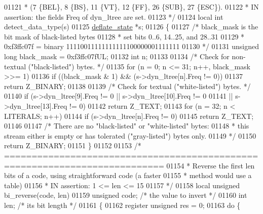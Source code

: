 \begin{DoxyCode}
{{{{{{{{{{{{{{{{{{{{{{{{01121 \textcolor{comment}{ *   (7 \{BEL\}, 8 \{BS\}, 11 \{VT\}, 12 \{FF\}, 26 \{SUB\}, 27 \{ESC\}).}
01122 \textcolor{comment}{ * IN assertion: the fields Freq of dyn\_ltree are set.}
01123 \textcolor{comment}{ */}
01124 local \textcolor{keywordtype}{int} detect\_data\_type(s)
01125     \hyperlink{structinternal__state}{deflate\_state} *s;
01126 \{
01127     \textcolor{comment}{/* black\_mask is the bit mask of black-listed bytes}
01128 \textcolor{comment}{     * set bits 0..6, 14..25, and 28..31}
01129 \textcolor{comment}{     * 0xf3ffc07f = binary 11110011111111111100000001111111}
01130 \textcolor{comment}{     */}
01131     \textcolor{keywordtype}{unsigned} \textcolor{keywordtype}{long} black\_mask = 0xf3ffc07fUL;
01132     \textcolor{keywordtype}{int} n;
01133 
01134     \textcolor{comment}{/* Check for non-textual ("black-listed") bytes. */}
01135     \textcolor{keywordflow}{for} (n = 0; n <= 31; n++, black\_mask >>= 1)
01136         \textcolor{keywordflow}{if} ((black\_mask & 1) && (s->dyn\_ltree[n].Freq != 0))
01137             \textcolor{keywordflow}{return} Z\_BINARY;
01138 
01139     \textcolor{comment}{/* Check for textual ("white-listed") bytes. */}
01140     \textcolor{keywordflow}{if} (s->dyn\_ltree[9].Freq != 0 || s->dyn\_ltree[10].Freq != 0
01141             || s->dyn\_ltree[13].Freq != 0)
01142         \textcolor{keywordflow}{return} Z\_TEXT;
01143     \textcolor{keywordflow}{for} (n = 32; n < LITERALS; n++)
01144         \textcolor{keywordflow}{if} (s->dyn\_ltree[n].Freq != 0)
01145             \textcolor{keywordflow}{return} Z\_TEXT;
01146 
01147     \textcolor{comment}{/* There are no "black-listed" or "white-listed" bytes:}
01148 \textcolor{comment}{     * this stream either is empty or has tolerated ("gray-listed") bytes only.}
01149 \textcolor{comment}{     */}
01150     \textcolor{keywordflow}{return} Z\_BINARY;
01151 \}
01152 
01153 \textcolor{comment}{/* ===========================================================================}
01154 \textcolor{comment}{ * Reverse the first len bits of a code, using straightforward code (a faster}
01155 \textcolor{comment}{ * method would use a table)}
01156 \textcolor{comment}{ * IN assertion: 1 <= len <= 15}
01157 \textcolor{comment}{ */}
01158 local \textcolor{keywordtype}{unsigned} bi\_reverse(code, len)
01159     \textcolor{keywordtype}{unsigned} code; \textcolor{comment}{/* the value to invert */}
01160     \textcolor{keywordtype}{int} len;       \textcolor{comment}{/* its bit length */}
01161 \{
01162     \textcolor{keyword}{register} \textcolor{keywordtype}{unsigned} res = 0;
01163     \textcolor{keywordflow}{do} \{
}}}}}}}}}}}}}}}}}}}}}}}}
\end{DoxyCode}
